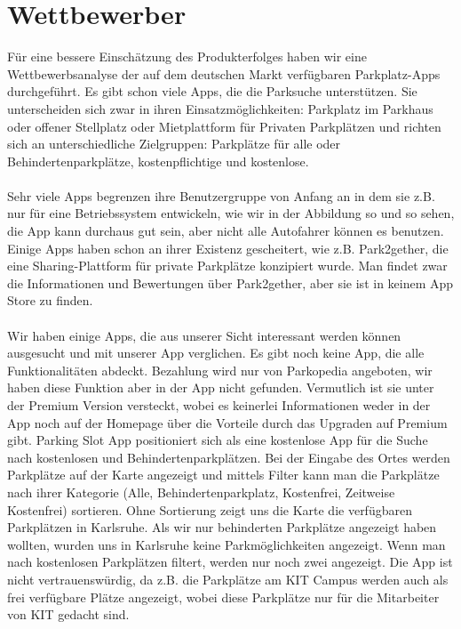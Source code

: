 \documentclass[12pt,ngerman, fleqn]{book} %
\begin{document}
\section{Wettbewerber}
Für eine bessere Einschätzung des Produkterfolges haben wir eine Wettbewerbsanalyse der auf dem deutschen Markt verfügbaren Parkplatz-Apps durchgeführt. Es gibt schon viele Apps, die die Parksuche unterstützen. Sie unterscheiden sich zwar in ihren Einsatzmöglichkeiten: Parkplatz im Parkhaus oder offener Stellplatz oder Mietplattform für Privaten Parkplätzen und richten sich an unterschiedliche Zielgruppen: Parkplätze für alle oder Behindertenparkplätze, kostenpflichtige und kostenlose.\\ \\ 
Sehr viele Apps begrenzen ihre Benutzergruppe von Anfang an in dem sie z.B. nur für eine Betriebssystem entwickeln, wie wir in der Abbildung so und so sehen, die App kann durchaus gut sein, aber nicht alle Autofahrer können es benutzen. Einige Apps haben schon an ihrer Existenz gescheitert, wie z.B. Park2gether, die eine Sharing-Plattform für private Parkplätze konzipiert wurde. Man findet zwar die Informationen und Bewertungen über Park2gether, aber sie ist in keinem App Store zu finden.\\ \\
Wir haben einige Apps, die aus unserer Sicht interessant werden können ausgesucht und mit unserer App verglichen. Es gibt noch keine App, die alle Funktionalitäten abdeckt. Bezahlung wird nur von Parkopedia angeboten, wir haben diese Funktion aber in der App nicht gefunden. Vermutlich ist sie unter der Premium Version versteckt, wobei es keinerlei Informationen weder in der App noch auf der Homepage über die Vorteile durch das Upgraden auf Premium gibt. Parking Slot App positioniert sich als eine kostenlose App für die Suche nach kostenlosen und Behindertenparkplätzen. Bei der Eingabe des Ortes werden Parkplätze auf der Karte angezeigt und mittels Filter kann man die Parkplätze nach ihrer Kategorie (Alle, Behindertenparkplatz, Kostenfrei, Zeitweise Kostenfrei) sortieren.  Ohne Sortierung zeigt uns die Karte die verfügbaren Parkplätzen in Karlsruhe. Als wir nur behinderten Parkplätze angezeigt haben wollten, wurden uns in Karlsruhe keine Parkmöglichkeiten angezeigt. Wenn man nach kostenlosen Parkplätzen filtert, werden nur noch zwei angezeigt. Die App ist nicht vertrauenswürdig, da z.B. die Parkplätze am KIT Campus werden auch als frei verfügbare Plätze angezeigt, wobei diese Parkplätze nur für die Mitarbeiter von KIT gedacht sind.\\ \\
\end{document}
